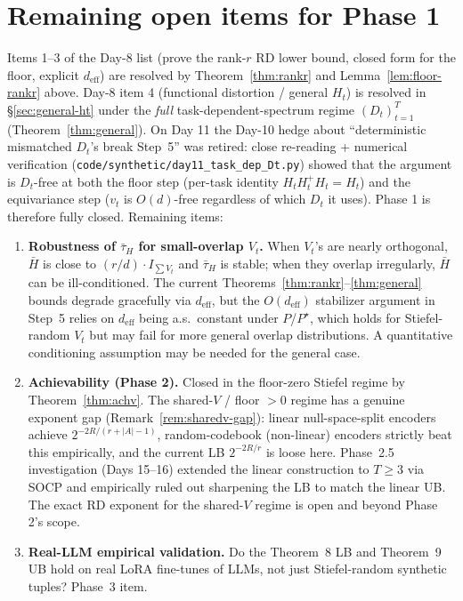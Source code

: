 \documentclass{article}
\theoremstyle{remark}
\newcommand{\deff}{d_{\mathrm{eff}}}
\newcommand{\tauH}{\bar\tau_{H}}
\newcommand{\Hbar}{\bar H}
\begin{document}
\section{Remaining open items for Phase 1}\label{sec:open}

Items 1--3 of the Day-8 list (prove the rank-$r$ RD lower bound,
closed form for the floor, explicit $\deff$) are resolved by
Theorem~\ref{thm:rankr} and Lemma~\ref{lem:floor-rankr} above. Day-8
item 4 (functional distortion / general $H_t$) is resolved in
\S\ref{sec:general-ht} under the \emph{full} task-dependent-spectrum
regime $(D_t)_{t=1}^T$ (Theorem~\ref{thm:general}). On Day 11 the
Day-10 hedge about ``deterministic mismatched $D_t$'s break Step~5''
was retired: close re-reading + numerical verification
(\texttt{code/synthetic/day11\_task\_dep\_Dt.py}) showed that the
argument is $D_t$-free at both the floor step (per-task identity
$H_t H_t^+ H_t = H_t$) and the equivariance step ($v_t$ is
$O(d)$-free regardless of which $D_t$ it uses). Phase 1 is therefore
fully closed. Remaining items:
\begin{enumerate}
  \item \textbf{Robustness of $\tauH$ for small-overlap $V_t$.} When
  $V_t$'s are nearly orthogonal, $\Hbar$ is close to $(r/d)\cdot
  I_{\sum V_t}$ and $\tauH$ is stable; when they overlap irregularly,
  $\Hbar$ can be ill-conditioned. The current
  Theorems~\ref{thm:rankr}--\ref{thm:general} bounds degrade
  gracefully via $\deff$, but the $O(\deff)$ stabilizer argument in
  Step~5 relies on $\deff$ being a.s.\ constant under $P$/$P^\star$,
  which holds for Stiefel-random $V_t$ but may fail for more general
  overlap distributions. A quantitative conditioning assumption may
  be needed for the general case.
  \item \textbf{Achievability (Phase 2).} Closed in the floor-zero
  Stiefel regime by Theorem~\ref{thm:achv}. The shared-$V$ /
  floor $>0$ regime has a genuine exponent gap
  (Remark~\ref{rem:sharedv-gap}): linear null-space-split encoders
  achieve $2^{-2R/(r+|A|-1)}$, random-codebook (non-linear) encoders
  strictly beat this empirically, and the current LB
  $2^{-2R/r}$ is loose here. Phase~2.5 investigation (Days 15--16)
  extended the linear construction to $T\geq 3$ via SOCP and
  empirically ruled out sharpening the LB to match the linear UB.
  The exact RD exponent for the shared-$V$ regime is open and
  beyond Phase 2's scope.
  \item \textbf{Real-LLM empirical validation.} Do the Theorem~8
  LB and Theorem~9 UB hold on real LoRA fine-tunes of LLMs, not
  just Stiefel-random synthetic tuples? Phase~3 item.
\end{enumerate}
\end{document}
